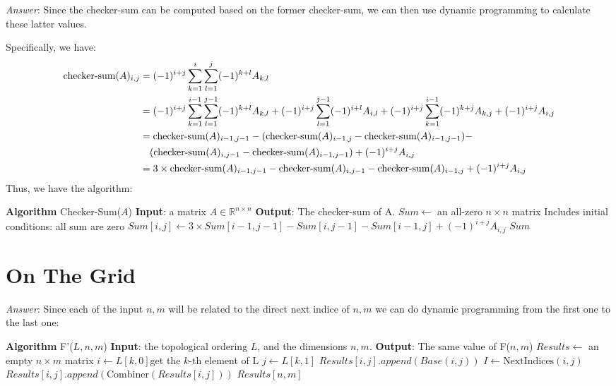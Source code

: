 \documentclass[11pt]{article}
\begin{document}
\noindent \emph{Answer}: Since the checker-sum can be computed based on the former checker-sum, we can then use dynamic programming to calculate these latter values.

Specifically, we have:
\begin{equation*}
\begin{aligned}
	\text{checker-sum}(A)_{i,j}&=(-1)^{i+j}\sum_{k=1}^{i}\sum_{l=1}^{j}(-1)^{k+l}A_{k,l}\\
	&=(-1)^{i+j}\sum_{k=1}^{i-1}\sum_{l=1}^{j-1}(-1)^{k+l}A_{k,l}+(-1)^{i+j}\sum_{l=1}^{j-1}(-1)^{i+l}A_{i,l}+(-1)^{i+j}\sum_{k=1}^{i-1}(-1)^{k+j}A_{k,j}+(-1)^{i+j}A_{i,j}\\
	&=\text{checker-sum}(A)_{i-1,j-1}-(\text{checker-sum}(A)_{i-1,j}-\text{checker-sum}(A)_{i-1,j-1})-\\
	&\text{\quad}(\text{checker-sum}(A)_{i,j-1}-\text{checker-sum}(A)_{i-1,j-1})+(-1)^{i+j}A_{i,j}\\
	&=3\times\text{checker-sum}(A)_{i-1,j-1} - \text{checker-sum}(A)_{i,j-1} - \text{checker-sum}(A)_{i-1,j} + (-1)^{i+j}A_{i,j}
\end{aligned}
\end{equation*}
Thus, we have the algorithm:
\begin{algorithmic}
	\State \textbf{Algorithm} Checker-Sum($A$)
	\State \textbf{Input}: a matrix $A\in \mathbb{R}^{n\times n}$
	\State \textbf{Output}: The checker-sum of A.
	\State $Sum \gets$ an all-zero $n\times n$ matrix \Comment Includes initial conditions: all sum are zero
			\State $Sum[i,j] \gets 3\times Sum[i-1,j-1]-Sum[i,j-1]-Sum[i-1,j]+(-1)^{i+j} A_{i,j}$
		\EndFor
	\EndFor
	\State \Return $Sum$
\end{algorithmic}
\section{On The Grid}
\noindent \emph{Answer}: Since each of the input $n,m$ will be related to the direct next indice of $n,m$ we can do dynamic programming from the first one to the last one:
\begin{algorithmic}
	\State \textbf{Algorithm} F'($L,n,m$)
	\State \textbf{Input}: the topological ordering $L$, and the dimensions $n,m$.
	\State \textbf{Output}: The same value of F($n,m$)
	\State $Results \gets$ an empty $n\times m$ matrix 
		\State $i\gets L[k,0]$\Comment get the $k$-th element of L
		\State $j\gets L[k,1]$
			\State $Results[i,j].append(Base(i,j))$
		\Else
			\State $I\gets\text{NextIndices}(i,j)$
				\State $Results[i,j].append(\text{Combiner}(Results[i,j]))$
			\EndFor
		\EndIf
	\EndFor
	\State \Return $Results[n,m]$
\end{algorithmic}
\end{document}
